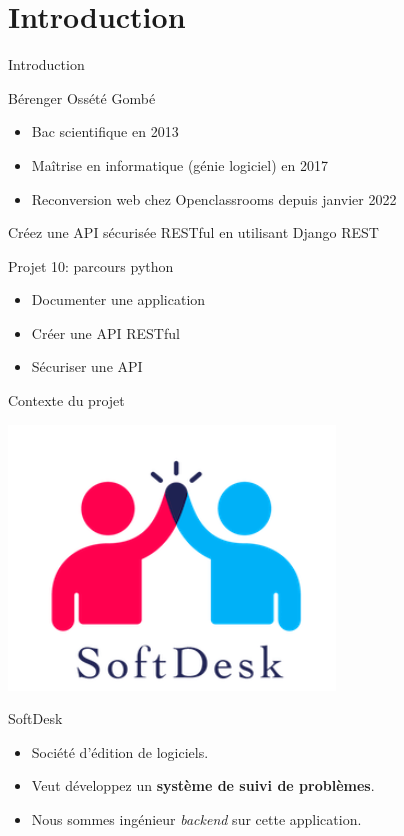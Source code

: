 \section{Introduction}

\begin{frame}{Introduction}
  \begin{block}{Bérenger Ossété Gombé}
    \begin{itemize}
    \item Bac scientifique en 2013
    \item Maîtrise en informatique (génie logiciel) en 2017
    \item Reconversion web chez Openclassrooms depuis janvier 2022
    \end{itemize}
  \end{block}
\end{frame}

\begin{frame}{Créez une API sécurisée RESTful en utilisant Django REST}
  \begin{block}{Projet 10: parcours python}
    \begin{itemize}
    \item Documenter une application
    \item Créer une API RESTful
    \item Sécuriser une API
    \end{itemize}
  \end{block}
\end{frame}

\begin{frame}{Contexte du projet}
  \begin{center}
    \includegraphics[scale=0.3]{images/logo.png}
  \end{center}
  
  \begin{block}{SoftDesk}
    \begin{itemize}
    \item Société d'édition de logiciels.
    \item Veut développez un \textbf{système de suivi de problèmes}.
    \item Nous sommes ingénieur \textit{backend} sur cette
      application.
    \end{itemize}
  \end{block}
\end{frame}
